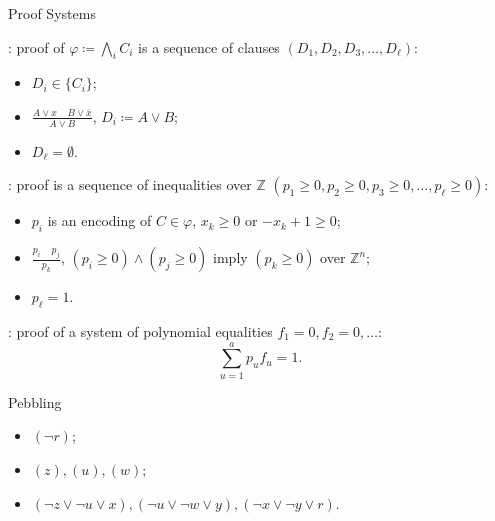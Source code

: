 \begin{frame}{Proof Systems}

    : proof of $\varphi \coloneqq \bigwedge\limits_{i} C_i$ is a sequence of clauses
    $(D_1, D_2, D_3, \dots, D_{\ell})$:
    \pause
    
    \begin{minipage}{0.3\linewidth}
        \begin{itemize}
            \item $D_i \in \{C_i\}$;
                \pause
            \item $\frac{A \lor x ~~~~~ B \lor \bar{x}}{A \lor B}$, $D_i \coloneqq A \lor B$;
                \pause
            \item $D_{\ell} = \emptyset$.
        \end{itemize}
    \end{minipage}
    \pause
    \begin{minipage}{0.68\linewidth}
        \centering
        
    \end{minipage}


    \pause
    \vspace{0.3cm}

    : proof is a sequence of inequalities over $\mathbb{Z}$
    $(p_1 \ge 0, p_2 \ge 0, p_3 \ge 0, \dots, p_{\ell} \ge 0)$:
    \begin{itemize}
        \item $p_i$ is an encoding of $C \in \varphi$, $x_k \ge 0$ or $-x_k + 1 \ge 0$;
        \item $\frac{p_i ~~~~~ p_j}{p_k}$,  $(p_i \ge 0) \land (p_j \ge 0)$ imply $(p_k \ge 0)$
            \alert{over $\mathbb{Z}^n$};
        \item $p_{\ell} = 1$.
    \end{itemize}

    \pause
    \vspace{0.3cm}

    : proof of a system of polynomial equalities $f_1 = 0, f_2 = 0, \dots$:
    $$
        \sum_{u = 1}^{a} p_u f_u = 1.
    $$
\end{frame}


\begin{frame}{Pebbling}

    \begin{center}
                
    \end{center}

    \pause
    \begin{itemize}
        \item $(\neg r)$;
            \pause
        \item $(z), (u), (w)$;
            \pause
        \item $(\neg z \lor \neg u \lor x), (\neg u \lor \neg w \lor y),
            (\neg x \lor \neg y \lor r)$.
    \end{itemize}

    \pause
    
\end{frame}

